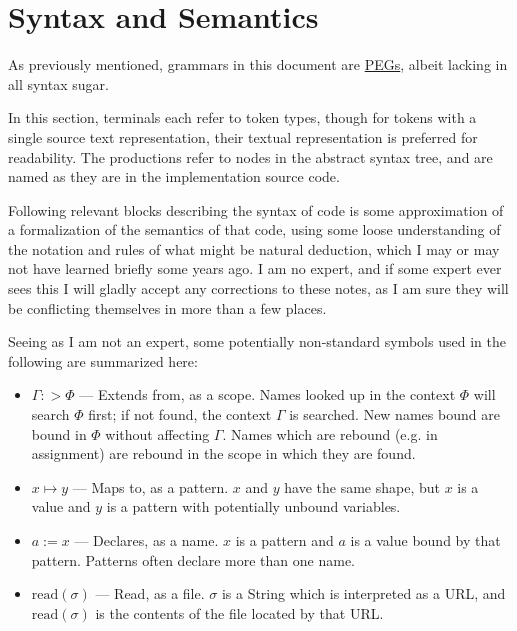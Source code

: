 \section{Syntax and Semantics}
\label{sec:syntax}

As previously mentioned, grammars in this document are
\href{https://en.wikipedia.org/wiki/Parsing_expression_grammar}{PEGs},
albeit lacking in all syntax sugar.

In this section, terminals each refer to token types, though for tokens
with a single source text representation, their textual representation
is preferred for readability. The productions refer to nodes in the
abstract syntax tree, and are named as they are in the implementation
source code.

Following relevant blocks describing the syntax of \Trilogy{} code is some
approximation of a formalization of the semantics of that code, using some
loose understanding of the notation and rules of what might be natural
deduction, which I may or may not have learned briefly some years ago.
I am no expert, and if some expert ever sees this I will gladly accept any
corrections to these notes, as I am sure they will be conflicting themselves
in more than a few places.

Seeing as I am not an expert, some potentially non-standard symbols used in
the following are summarized here:

\begin{itemize}
    \item $\Gamma :> \Phi$ --- Extends from, as a scope. Names looked up in the
    context $\Phi$ will search $\Phi$ first; if not found, the context $\Gamma$
    is searched. New names bound are bound in $\Phi$ without affecting $\Gamma$.
    Names which are rebound (e.g. in assignment) are rebound in the scope in
    which they are found.
    \item $x \mapsto y$ --- Maps to, as a pattern. $x$ and $y$ have the same
    shape, but $x$ is a value and $y$ is a pattern with potentially unbound
    variables.
    \item $a := x$ --- Declares, as a name. $x$ is a pattern and $a$ is a value
    bound by that pattern. Patterns often declare more than one name.
    \item $\text{read}(\sigma)$ --- Read, as a file. $\sigma$ is a String which is interpreted
    as a URL, and $\text{read}(\sigma)$ is the contents of the file located by that URL.
\end{itemize}

